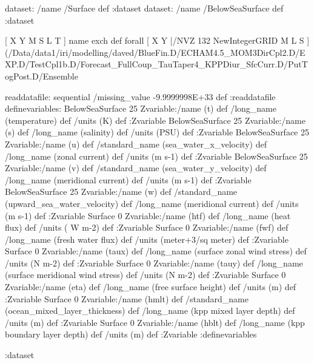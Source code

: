 \begin{ingrid}
dataset: /name /Surface def :dataset
dataset: /name /BelowSeaSurface def :dataset

[ X Y M S L T ] { name exch def } forall
[ X Y |/NVZ 132  NewIntegerGRID M L S ]
(/Data/data1/iri/modelling/daved/BlueFin.D/ECHAM4.5_MOM3DirCpl2.D/EXP.D/TestCpl1b.D/Forecast_FullCoup_TauTaper4_KPPDiur_SfcCurr.D/PutTogPost.D/Ensemble%

readdatafile:
sequential
/missing_value  -9.9999998E+33 def
:readdatafile
definevariables:
BelowSeaSurface 25 Zvariable:/name (t) def /long_name (temperature)  def /units (K) def :Zvariable
BelowSeaSurface 25 Zvariable:/name (s) def /long_name (salinity) def /units (PSU) def :Zvariable
BelowSeaSurface 25 Zvariable:/name (u) def /standard_name (sea_water_x_velocity) def /long_name (zonal current)  def /units (m s-1) def :Zvariable
BelowSeaSurface 25 Zvariable:/name (v) def /standard_name (sea_water_y_velocity) def /long_name (meridional current)  def /units (m s-1) def :Zvariable
BelowSeaSurface 25 Zvariable:/name (w) def /standard_name (upward_sea_water_velocity) def /long_name (meridional current)  def /units (m s-1) def :Zvariable
Surface 0 Zvariable:/name (htf) def /long_name (heat flux) def /units ( W m-2) def :Zvariable
Surface 0 Zvariable:/name (fwf) def /long_name (fresh water flux) def /units (meter+3/sq meter) def :Zvariable
Surface 0 Zvariable:/name (taux) def /long_name (surface zonal wind stress) def /units (N m-2) def :Zvariable
Surface 0 Zvariable:/name (tauy) def /long_name (surface meridional wind stress) def /units (N m-2) def :Zvariable
Surface 0 Zvariable:/name (eta) def /long_name (free surface height) def /units (m) def :Zvariable
Surface 0 Zvariable:/name (hmlt) def /standard_name (ocean_mixed_layer_thickness) def /long_name (kpp mixed layer depth) def /units (m) def :Zvariable
Surface 0 Zvariable:/name (hblt) def /long_name (kpp boundary layer depth) def /units (m) def :Zvariable
:definevariables

:dataset
\end{ingrid}



